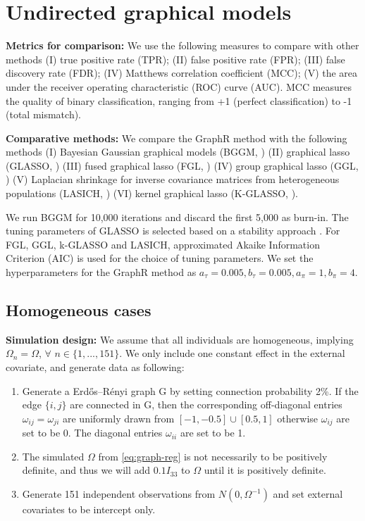 \documentclass[
]{book}
\begin{document}
\hypertarget{undir}{%
\section{Undirected graphical models}\label{undir}}

\textbf{Metrics for comparison:} We use the following measures to compare with other methods (I) true positive rate (TPR); (II) false positive rate (FPR); (III) false discovery rate (FDR); (IV) Matthews correlation coefficient (MCC); (V) the area under the receiver operating characteristic (ROC) curve (AUC). MCC \citep{matthews1975comparison} measures the quality of binary classification, ranging from +1 (perfect classification) to -1 (total mismatch).

\textbf{Comparative methods:} We compare the GraphR method with the following methods (I) Bayesian Gaussian graphical models (BGGM, \citet{mohammadi2015bayesian}) (II) graphical lasso (GLASSO, \citet{friedman2008sparse}) (III) fused graphical lasso (FGL, \citet{danaher2014joint}) (IV) group graphical lasso (GGL, \citet{danaher2014joint}) (V) Laplacian shrinkage for inverse covariance matrices from heterogeneous populations (LASICH, \citet{saegusa2016joint}) (VI) kernel graphical lasso (K-GLASSO, \citet{liu2010graph}).

We run BGGM for 10,000 iterations and discard the first 5,000 as burn-in. The tuning parameters of GLASSO is selected based on a stability approach \cite{liu2010stability}. For FGL, GGL, k-GLASSO and LASICH, approximated Akaike Information Criterion (AIC) is used for the choice of tuning parameters. We set the hyperparameters for the GraphR method as \(a_\tau = 0.005, b_\tau = 0.005, a_\pi = 1, b_\pi =4\).

\hypertarget{simhomo}{%
\subsection{Homogeneous cases}\label{simhomo}}

\textbf{Simulation design:}
We assume that all individuals are homogeneous, implying \(\Omega_n = \Omega\), \(\forall\) \(n \in \{1,...,151\}\). We only include one constant effect in the external covariate, and generate data as following:

\begin{enumerate}
\def\labelenumi{(\Roman{enumi})}
\item
  Generate a Erdős--Rényi graph G by setting connection probability 2\%. If the edge \(\{i,j\}\) are connected in G, then the corresponding off-diagonal entries \(\omega_{ij} = \omega_{ji}\) are uniformly drawn from \([-1,-0.5] \cup [0.5,1]\) otherwise \(\omega_{ij}\) are set to be 0. The diagonal entries \(\omega_{ii}\) are set to be 1.
\item
  The simulated \(\Omega\) from \eqref{eq:graph-reg} is not necessarily to be positively definite, and thus we will add \(0.1I_{33}\) to \(\Omega\) until it is positively definite.
\item
  Generate 151 independent observations from \(N(0, \Omega^{-1})\) and set external covariates to be intercept only.
\end{enumerate}
\end{document}
